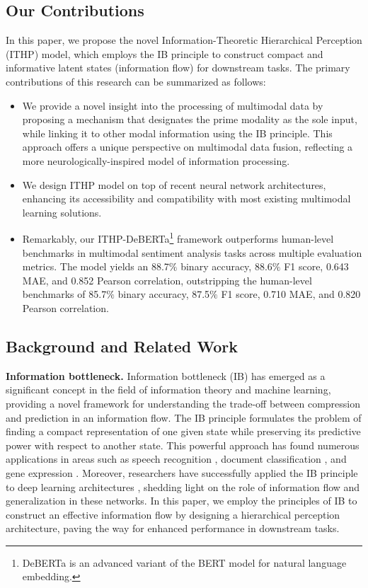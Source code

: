 \documentclass{article} %
\begin{document}
\subsection{Our Contributions}
In this paper, we propose the novel Information-Theoretic Hierarchical Perception (ITHP) model, which employs the IB principle to construct compact and informative latent states (information flow) for downstream tasks. The primary contributions of this research can be summarized as follows: 
\begin{itemize}
    \item We provide a novel insight into the processing of multimodal data by proposing a mechanism that designates the prime modality as the sole input, while linking it to other modal information using the IB principle. This approach offers a unique perspective on multimodal data fusion, reflecting a more neurologically-inspired model of information processing. 
    \item We design ITHP model on top of recent neural network architectures, enhancing its accessibility and compatibility with most existing multimodal learning solutions. 
    \item Remarkably, our ITHP-DeBERTa\footnote{DeBERTa is an advanced variant of the BERT model for natural language embedding.} framework outperforms human-level benchmarks in multimodal sentiment analysis tasks across multiple evaluation metrics. The model yields an 88.7$\%$ binary accuracy, 88.6$\%$ F1 score, 0.643 MAE, and 0.852 Pearson correlation, outstripping the human-level benchmarks of 85.7$\%$ binary accuracy, 87.5$\%$ F1 score, 0.710 MAE, and 0.820 Pearson correlation.
\end{itemize}
\subsection{Background and Related Work}
\textbf{Information bottleneck.} Information bottleneck (IB) has emerged as a significant concept in the field of information theory and machine learning, providing a novel framework for understanding the trade-off between compression and prediction in an information flow. The IB principle formulates the problem of finding a compact representation of one given state while preserving its predictive power with respect to another state. This powerful approach has found numerous applications in areas such as speech recognition \citep{hecht2005extraction}, document classification \citep{slonim2000document}, and gene expression \citep{friedman2001multivariate}. Moreover, researchers have successfully applied the IB principle to deep learning architectures \citep{shwartz2017opening,tishby2015deep}, shedding light on the role of information flow and generalization in these networks. In this paper, we employ the principles of IB to construct an effective information flow by designing a hierarchical perception architecture, paving the way for enhanced performance in downstream tasks.
\end{document}
